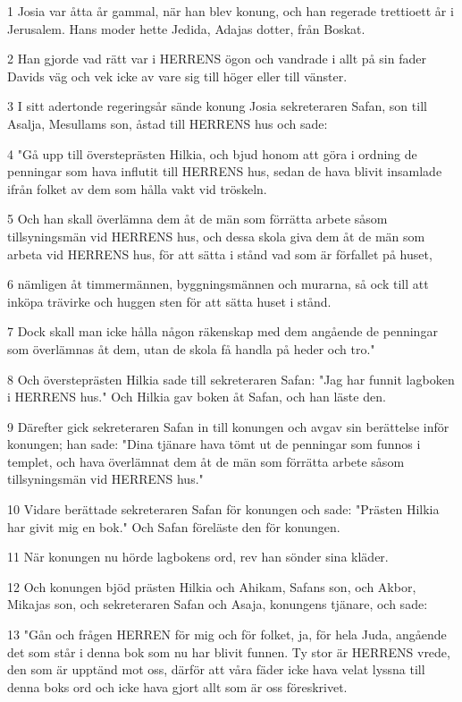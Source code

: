 \par 1 Josia var åtta år gammal, när han blev konung, och han regerade trettioett år i Jerusalem. Hans moder hette Jedida, Adajas dotter, från Boskat.
\par 2 Han gjorde vad rätt var i HERRENS ögon och vandrade i allt på sin fader Davids väg och vek icke av vare sig till höger eller till vänster.
\par 3 I sitt adertonde regeringsår sände konung Josia sekreteraren Safan, son till Asalja, Mesullams son, åstad till HERRENS hus och sade:
\par 4 "Gå upp till översteprästen Hilkia, och bjud honom att göra i ordning de penningar som hava influtit till HERRENS hus, sedan de hava blivit insamlade ifrån folket av dem som hålla vakt vid tröskeln.
\par 5 Och han skall överlämna dem åt de män som förrätta arbete såsom tillsyningsmän vid HERRENS hus, och dessa skola giva dem åt de män som arbeta vid HERRENS hus, för att sätta i stånd vad som är förfallet på huset,
\par 6 nämligen åt timmermännen, byggningsmännen och murarna, så ock till att inköpa trävirke och huggen sten för att sätta huset i stånd.
\par 7 Dock skall man icke hålla någon räkenskap med dem angående de penningar som överlämnas åt dem, utan de skola få handla på heder och tro."
\par 8 Och översteprästen Hilkia sade till sekreteraren Safan: "Jag har funnit lagboken i HERRENS hus." Och Hilkia gav boken åt Safan, och han läste den.
\par 9 Därefter gick sekreteraren Safan in till konungen och avgav sin berättelse inför konungen; han sade: "Dina tjänare hava tömt ut de penningar som funnos i templet, och hava överlämnat dem åt de män som förrätta arbete såsom tillsyningsmän vid HERRENS hus."
\par 10 Vidare berättade sekreteraren Safan för konungen och sade: "Prästen Hilkia har givit mig en bok." Och Safan föreläste den för konungen.
\par 11 När konungen nu hörde lagbokens ord, rev han sönder sina kläder.
\par 12 Och konungen bjöd prästen Hilkia och Ahikam, Safans son, och Akbor, Mikajas son, och sekreteraren Safan och Asaja, konungens tjänare, och sade:
\par 13 "Gån och frågen HERREN för mig och för folket, ja, för hela Juda, angående det som står i denna bok som nu har blivit funnen. Ty stor är HERRENS vrede, den som är upptänd mot oss, därför att våra fäder icke hava velat lyssna till denna boks ord och icke hava gjort allt som är oss föreskrivet.
